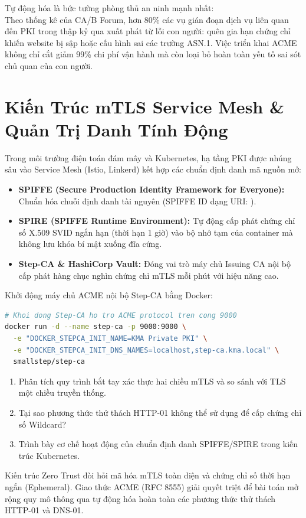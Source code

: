 \begin{batngo}
Tự động hóa là bức tường phòng thủ an ninh mạnh nhất:\\
Theo thống kê của CA/B Forum, hơn 80\% các vụ gián đoạn dịch vụ liên quan đến PKI trong thập kỷ qua xuất phát từ lỗi con người: quên gia hạn chứng chỉ khiến website bị sập hoặc cấu hình sai các trường ASN.1. Việc triển khai ACME không chỉ cắt giảm 99\% chi phí vận hành mà còn loại bỏ hoàn toàn yếu tố sai sót chủ quan của con người.
\end{batngo}

\section{Kiến Trúc mTLS Service Mesh \& Quản Trị Danh Tính Động}

Trong môi trường điện toán đám mây và Kubernetes, hạ tầng PKI được nhúng sâu vào Service Mesh (Istio, Linkerd) kết hợp các chuẩn định danh mã nguồn mở:
\begin{itemize}
  \item \textbf{SPIFFE (Secure Production Identity Framework for Everyone):} Chuẩn hóa chuỗi định danh tài nguyên (SPIFFE ID dạng URI: ).
  \item \textbf{SPIRE (SPIFFE Runtime Environment):} Tự động cấp phát chứng chỉ số X.509 SVID ngắn hạn (thời hạn 1 giờ) vào bộ nhớ tạm của container mà không lưu khóa bí mật xuống đĩa cứng.
  \item \textbf{Step-CA \& HashiCorp Vault:} Đóng vai trò máy chủ Issuing CA nội bộ cấp phát hàng chục nghìn chứng chỉ mTLS mỗi phút với hiệu năng cao.
\end{itemize}

\begin{chayngay}
Khởi động máy chủ ACME nội bộ Step-CA bằng Docker:
\begin{lstlisting}[language=bash]
# Khoi dong Step-CA ho tro ACME protocol tren cong 9000
docker run -d --name step-ca -p 9000:9000 \
  -e "DOCKER_STEPCA_INIT_NAME=KMA Private PKI" \
  -e "DOCKER_STEPCA_INIT_DNS_NAMES=localhost,step-ca.kma.local" \
  smallstep/step-ca
\end{lstlisting}
\end{chayngay}

\begin{tukiemtra}
\begin{enumerate}
  \item Phân tích quy trình bắt tay xác thực hai chiều mTLS và so sánh với TLS một chiều truyền thống.
  \item Tại sao phương thức thử thách HTTP-01 không thể sử dụng để cấp chứng chỉ số Wildcard?
  \item Trình bày cơ chế hoạt động của chuẩn định danh SPIFFE/SPIRE trong kiến trúc Kubernetes.
\end{enumerate}
\end{tukiemtra}

\begin{kbox}
Kiến trúc Zero Trust đòi hỏi mã hóa mTLS toàn diện và chứng chỉ số thời hạn ngắn (Ephemeral). Giao thức ACME (RFC 8555) giải quyết triệt để bài toán mở rộng quy mô thông qua tự động hóa hoàn toàn các phương thức thử thách HTTP-01 và DNS-01.
\end{kbox}
